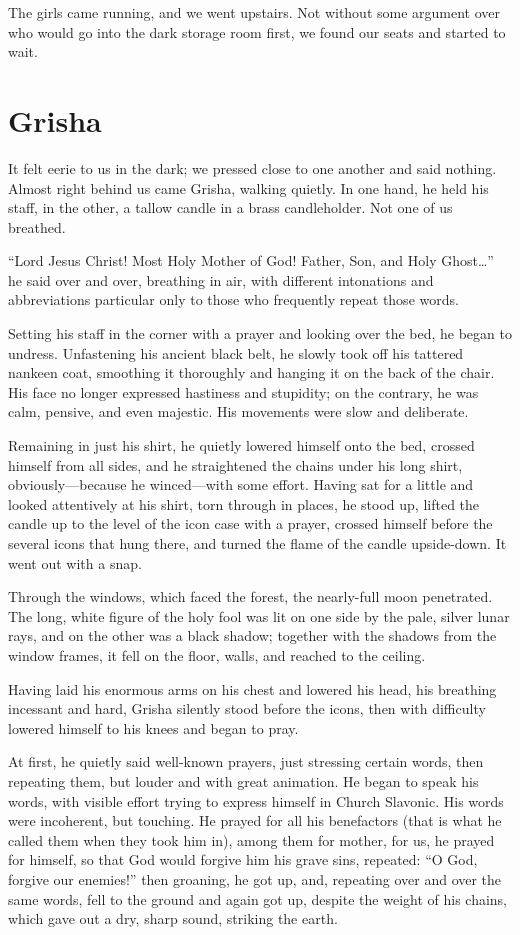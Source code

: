 The girls came running, and we went upstairs. Not without some argument over who would go into the dark storage room first, we found our seats and started to wait.

\chapter{Grisha}

It felt eerie to us in the dark; we pressed close to one another and said nothing. Almost right behind us came Grisha, walking quietly. In one hand, he held his staff, in the other, a tallow candle in a brass candleholder. Not one of us breathed.

``Lord Jesus Christ! Most Holy Mother of God! Father, Son, and Holy Ghost\ldots{}'' he said over and over, breathing in air, with different intonations and abbreviations particular only to those who frequently repeat those words.

Setting his staff in the corner with a prayer and looking over the bed, he began to undress. Unfastening his ancient black belt, he slowly took off his tattered nankeen coat, smoothing it thoroughly and hanging it on the back of the chair. His face no longer expressed hastiness and stupidity; on the contrary, he was calm, pensive, and even majestic. His movements were slow and deliberate.

Remaining in just his shirt, he quietly lowered himself onto the bed, crossed himself from all sides, and he straightened the chains under his long shirt, obviously---because he winced---with some effort. Having sat for a little and looked attentively at his shirt, torn through in places, he stood up, lifted the candle up to the level of the icon case with a prayer, crossed himself before the several icons that hung there, and turned the flame of the candle upside-down. It went out with a snap.

Through the windows, which faced the forest, the nearly-full moon penetrated. The long, white figure of the holy fool was lit on one side by the pale, silver lunar rays, and on the other was a black shadow; together with the shadows from the window frames, it fell on the floor, walls, and reached to the ceiling.

Having laid his enormous arms on his chest and lowered his head, his breathing incessant and hard, Grisha silently stood before the icons, then with difficulty lowered himself to his knees and began to pray.

At first, he quietly said well-known prayers, just stressing certain words, then repeating them, but louder and with great animation. He began to speak his words, with visible effort trying to express himself in Church Slavonic. His words were incoherent, but touching. He prayed for all his benefactors (that is what he called them when they took him in), among them for mother, for us, he prayed for himself, so that God would forgive him his grave sins, repeated: ``O God, forgive our enemies!'' then groaning, he got up, and, repeating over and over the same words, fell to the ground and again got up, despite the weight of his chains, which gave out a dry, sharp sound, striking the earth.

